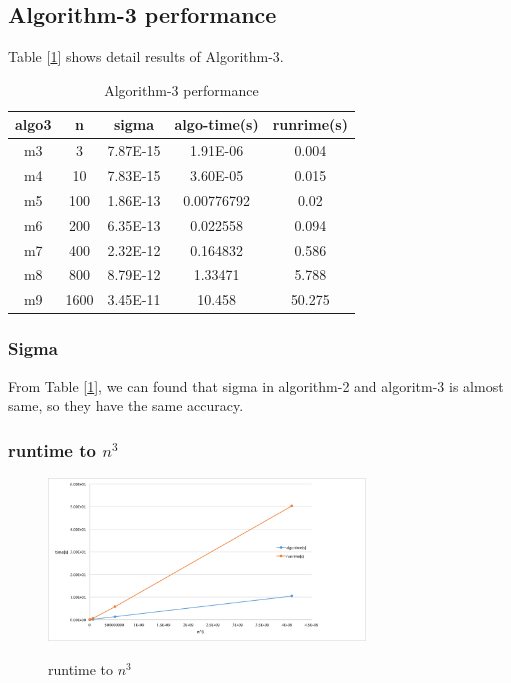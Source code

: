 \documentclass{article}
\begin{document}
\subsection{Algorithm-3 performance}
Table [\ref{tab:algo3}] shows detail results of Algorithm-3.
\begin{table}[htbp]
    \centering
    \caption{Algorithm-3 performance}
    \begin{tabular}{|c|c|c|c|c|}
        \hline
        \textbf{algo3} & \multicolumn{1}{c|}{n} & \multicolumn{1}{c|}{sigma} & \multicolumn{1}{l|}{algo-time(s)} & \multicolumn{1}{c|}{runrime(s)} \bigstrut\\
        \hline
        m3  & 3   & 7.87E-15 & 1.91E-06 & 0.004 \bigstrut\\
        \hline
        m4  & 10  & 7.83E-15 & 3.60E-05 & 0.015 \bigstrut\\
        \hline
        m5  & 100 & 1.86E-13 & 0.00776792 & 0.02 \bigstrut\\
        \hline
        m6  & 200 & 6.35E-13 & 0.022558 & 0.094 \bigstrut\\
        \hline
        m7  & 400 & 2.32E-12 & 0.164832 & 0.586 \bigstrut\\
        \hline
        m8  & 800 & 8.79E-12 & 1.33471 & 5.788 \bigstrut\\
        \hline
        m9  & 1600 & 3.45E-11 & 10.458 & 50.275 \bigstrut\\
        \hline
    \end{tabular}%
    \label{tab:algo3}
\end{table}%
\subsubsection{Sigma}
From Table [\ref{tab:algo3}], we can found that sigma in algorithm-2 and algoritm-3 is almost same, so they have the same accuracy.
\subsubsection{runtime to $n^3$}
\begin{figure}[H]
    \centering
    \caption{runtime to $n^3$}
    \includegraphics[width=0.75\textwidth]{src/algo3-runtime.png}
    \label{fig:algo3-runtime}
\end{figure}
\end{document}
